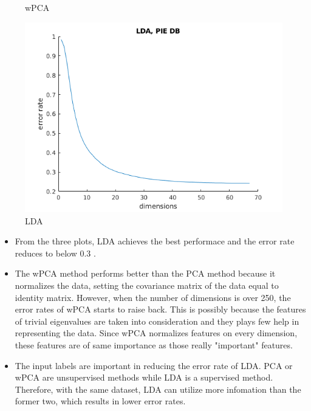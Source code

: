 \documentclass[a4paper]{article}
\begin{document}
\begin{figure}[htb]
\begin{minipage}{0.33\textwidth}
     \caption{wPCA}\label{Fig:wPCA}
   \end{minipage}
   \begin{minipage}{0.33\textwidth}
     \centering
     \includegraphics[width=1\linewidth]{../pic/LDA.png}
     \caption{LDA}\label{Fig:LDA}
   \end{minipage}
\end{figure}

\begin{itemize}
    \item{From the three plots, LDA achieves the best performace and the error rate reduces to below 0.3 .}
    \item{The wPCA method performs better than the PCA method because it normalizes the data, setting the covariance matrix of the data equal to identity matrix. However, when the number of dimensions is over 250, the error rates of wPCA starts to raise back. This is possibly because the features of trivial eigenvalues are taken into consideration and they plays few help in representing the data. Since wPCA normalizes features on every dimension, these features are of same importance as those really "important" features.}
    \item{The input labels are important in reducing the error rate of LDA. PCA or wPCA are unsupervised methods while LDA is a supervised method. Therefore, with the same dataset, LDA can utilize more infomation than the former two, which results in lower error rates. }
\end{itemize}
\end{document}
